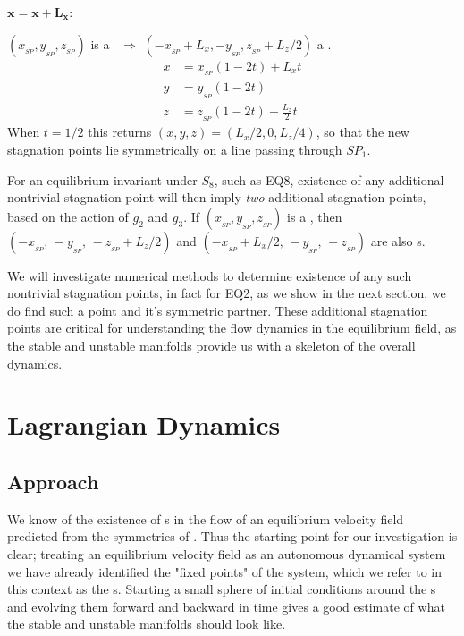 \documentclass[letter,10pt,openany]{article}
\begin{document}
 \noindent$\mathbf{x = x + L_{x}}$:

 \noindent $(x_{_{SP}},y_{_{SP}},z_{_{SP}})$ is a \stagp\ $\Rightarrow$
 $(-x_{_{SP}}+L_{x},-y_{_{SP}},z_{_{SP}}+L_{z}/2)$ a \stagp.
 \begin{align}
  x &= x_{_{SP}}(1-2t) + L_{x}t \\
  y &= y_{_{SP}}(1-2t) \\
  z &= z_{_{SP}}(1-2t) + \frac{L_{z}}{2} t
 \end{align}
 When $t = 1/2$ this returns $(x,y,z) = (L_{x}/2,0,L_{z}/4)$, so that the new stagnation
 points lie symmetrically on a line passing through $SP_1$. 

 For an equilibrium invariant under $S_8$, such as EQ8, existence of any additional nontrivial stagnation point will then imply \textit{two} additional stagnation points, based on the action of $g_2$ and $g_3$.
 If $(x_{_{SP}},y_{_{SP}},z_{_{SP}})$ is a \stagp, then  $(-x_{_{SP}},\, -y_{_{SP}},\, -z_{_{SP}}+L_z/2)$ and $(-x_{_{SP}} + L_x/2,\, -y_{_{SP}},\, -z_{_{SP}})$ are also \stagp s. 

 We will investigate numerical methods to determine existence of any such nontrivial stagnation points, in fact for EQ2, as we show in the next section, we do find such a point and it's symmetric partner. These additional stagnation points are critical for understanding the flow dynamics in the equilibrium field, as the stable and unstable manifolds provide us with a skeleton of the overall dynamics.
 

 
 



\section{Lagrangian Dynamics}
\label{sec:Lagrangian}


\subsection{Approach}
\label{sec:approach}

We know of the existence of  \stagp s in the flow of an equilibrium velocity field
predicted from the symmetries of \pCf. Thus the starting point for our investigation is clear; treating an equilibrium velocity field as an autonomous dynamical system we have already identified the "fixed points" of the system, which we refer to in this context as the \stagp s.  Starting a small
sphere of initial conditions around the \stagp s and evolving them
forward and backward in time gives a good estimate of what the stable and
unstable manifolds should look like. 
\end{document}
